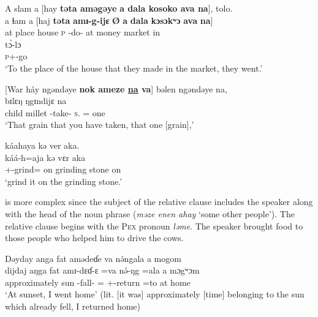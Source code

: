 \ea \label{ex:5:104}
A  slam  a  [hay  \textbf{təta aməgəye}  \textbf{a  dala  kosoko  ava na}],  tolo.\\
\gll  a  ɬam  a  [haj  \textbf{təta}  \textbf{amɪ-g-ijɛ}   \textbf{Ø}  \textbf{a}  \textbf{dala}  \textbf{kɔsɔkʷɔ}  \textbf{ava}   \textbf{na}]\\
      at   place  {\GEN}  house  \textsc{p}  {\DEP}-do-{\CL}  { }  {at}  money  market  in  {\PSP}\\
      
 \medskip
 \gll     t\`{ɔ}-lɔ\\
      \textsc{p}+{\PFV}-go\\
\glt  ‘To the place of the house that they made in the market, they went.’
\z


\ea \label{ex:5:105}
{}[War  háy  ngəndəye  \textbf{nok  ameze \underline{na} va}]  bəlen  ngəndəye  na,\\  
\gll  [war  haj      ŋgɪndijɛ   \textbf{nɔkʷ} \textbf{amɛ-ʒ-ɛ} \textbf{\underline{na}}  \textbf{=va}]    bɪlɛŋ  ŋgɪndijɛ  na\\
      child    millet  {\DEM}  {\twoS}  {\DEP}-take-{\CL}  \textsc{s}.{\DO}   ={\PRF}  one   {\DEM}  {\PSP}\\
\glt ‘That grain that you have taken, that one [grain],’
      
\medskip
káahaya  kə  ver  aka.\\
\gll  káá-h=aja            kə  vɛr             aka\\
      {\twoS}+{\POT}-grind={\PLU}  on  {grinding stone}       on\\
\glt  ‘grind it on the grinding stone.’
\z

 is more complex since the subject of the relative clause includes the speaker along with the head of the noun phrase (\textit{məze  enen  ahay} ‘some other people’).  The relative clause begins with the \textsc{Pex} pronoun \textit{ləme}. The speaker brought food to those people who helped him to drive the cows. 

\ea \label{ex:5:106}
Dəyday  anga  fat  amədeɗe  va  n\'{ə}ngala  a  mogom\\  
\gll  dijdaj     aŋga   fat   amɪ-dɛɗ-ɛ  =va  n\'{ə}-ŋg    =ala  a  mɔgʷɔm\\
      approximately  {\POSS}  sun  {\DEP}-fall-{\CL}   ={\PRF}  {\oneS}+{\IFV}-return  =to  at  home\\
\glt ‘At sunset, I went home’ (lit. [it was] approximately [time] belonging to the sun which already fell, I returned home)
      
